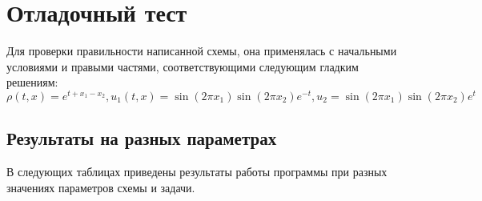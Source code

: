 \section{Отладочный тест}

Для проверки правильности написанной схемы, она применялась с начальными условиями и правыми частями, соответствующими следующим гладким решениям:
\begin{equation*}
    \rho(t, x) = e^{t + x_1 - x_2}, u_1(t, x) = \sin(2\pi x_1)\sin(2\pi x_2)e^{-t}, u_2 = \sin(2\pi x_1)\sin(2\pi x_2)e^{t}
\end{equation*}

\subsection{Результаты на разных параметрах}

В следующих таблицах приведены результаты работы программы при разных значениях параметров схемы и задачи.

